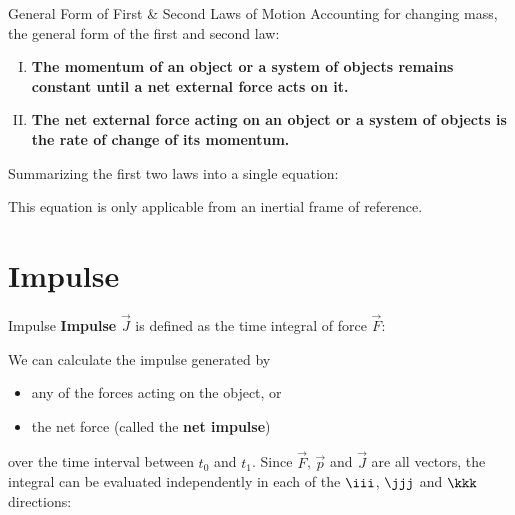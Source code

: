 \documentclass[12pt,compress,aspectratio=169]{beamer}
\begin{document}
\begin{frame}{General Form of First \& Second Laws of Motion}
  Accounting for changing mass, the general form of the first and second law:
  \begin{enumerate}[I.]
  \item\textbf{The momentum of an object or a system of objects remains
    constant until a net external force acts on it.}
  \item\textbf{The net external force acting on an object or a system of
    objects is the rate of change of its momentum.}
  \end{enumerate}
  Summarizing the first two laws into a single equation:


  This equation is only applicable from an inertial frame of reference.
\end{frame}



\section{Impulse}

\begin{frame}{Impulse}
  \textbf{Impulse} $\vec J$ is defined as the time integral of force $\vec F$:


  We can calculate the impulse generated by
  \begin{itemize}
  \item any of the forces acting on the object, or
  \item the net force (called the \textbf{net impulse})
  \end{itemize}
  over the time interval between $t_0$ and $t_1$. Since $\vec F$, $\vec p$ and
  $\vec J$ are all vectors, the integral can be evaluated independently in each
  of the $\iii$, $\jjj$ and $\kkk$ directions:
  
\end{frame}
\end{document}
